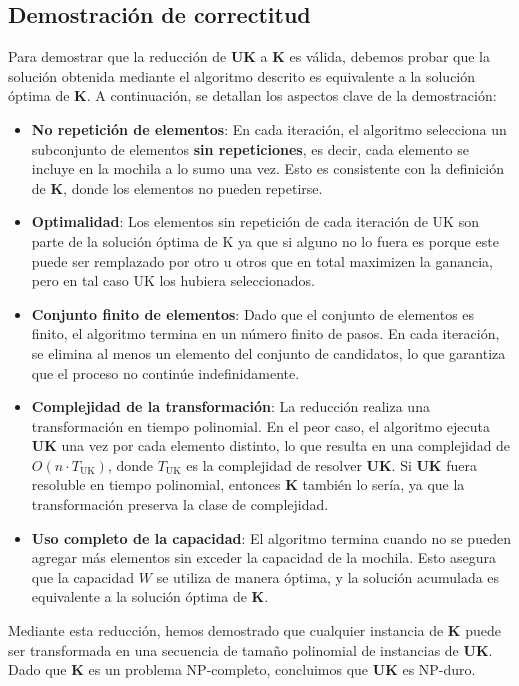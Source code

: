 \documentclass{report}
\begin{document}
\subsection*{Demostración de correctitud}

Para demostrar que la reducción de \textbf{UK} a \textbf{K} es válida, debemos probar que la solución obtenida mediante el algoritmo descrito es equivalente a la solución óptima de \textbf{K}. A continuación, se detallan los aspectos clave de la demostración:

\begin{itemize}
	\item \textbf{No repetición de elementos}: En cada iteración, el algoritmo selecciona un subconjunto de elementos \textbf{sin repeticiones}, es decir, cada elemento se incluye en la mochila a lo sumo una vez. Esto es consistente con la definición de \textbf{K}, donde los elementos no pueden repetirse.
	
	\item \textbf{Optimalidad}: Los elementos sin repetición de cada iteración de UK son parte de la solución óptima de K ya que si alguno no lo fuera es porque este puede ser remplazado por otro u otros que en total maximizen la ganancia, pero en tal caso UK los hubiera seleccionados.
	
	\item \textbf{Conjunto finito de elementos}: Dado que el conjunto de elementos es finito, el algoritmo termina en un número finito de pasos. En cada iteración, se elimina al menos un elemento del conjunto de candidatos, lo que garantiza que el proceso no continúe indefinidamente.
	
	\item \textbf{Complejidad de la transformación}: La reducción realiza una transformación en tiempo polinomial. En el peor caso, el algoritmo ejecuta \textbf{UK} una vez por cada elemento distinto, lo que resulta en una complejidad de \( O(n \cdot T_{\text{UK}}) \), donde \( T_{\text{UK}} \) es la complejidad de resolver \textbf{UK}. Si \textbf{UK} fuera resoluble en tiempo polinomial, entonces \textbf{K} también lo sería, ya que la transformación preserva la clase de complejidad.
	
	\item \textbf{Uso completo de la capacidad}: El algoritmo termina cuando no se pueden agregar más elementos sin exceder la capacidad de la mochila. Esto asegura que la capacidad \( W \) se utiliza de manera óptima, y la solución acumulada es equivalente a la solución óptima de \textbf{K}.
\end{itemize}
Mediante esta reducción, hemos demostrado que cualquier instancia de \textbf{K} puede ser transformada en una secuencia de tamaño polinomial de instancias de \textbf{UK}. Dado que \textbf{K} es un problema NP-completo, concluimos que \textbf{UK} es NP-duro.
\end{document}
